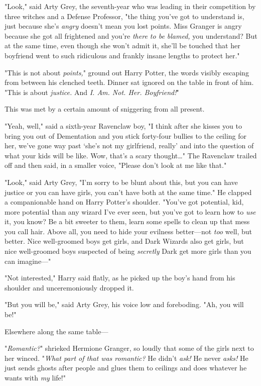 "Look," said Arty Grey, the seventh-year who was leading in their competition 
by three witches and a Defense Professor, "the thing you've got to understand 
is, just because she's \emph{angry} doesn't mean you lost points. Miss Granger 
is angry because she got all frightened and you're \emph{there to be blamed,} 
you understand? But at the same time, even though she won't admit it, she'll be 
touched that her boyfriend went to such ridiculous and frankly insane lengths 
to protect her."

"This is not about \emph{points,}" ground out Harry Potter, the words visibly 
escaping from between his clenched teeth. Dinner sat ignored on the table in 
front of him. "This is about \emph{justice.} And \emph{I. Am. Not. Her. 
Boyfriend!}"

This was met by a certain amount of sniggering from all present.

"Yeah, well," said a sixth-year Ravenclaw boy, "I think after she kisses you to 
bring you out of Dementation and you stick forty-four bullies to the ceiling 
for her, we've gone way past `she's not my girlfriend, really' and into the 
question of what your kids will be like. Wow, that's a scary thought{\ldots}" 
The Ravenclaw trailed off and then said, in a smaller voice, "Please don't look 
at me like that."

"Look," said Arty Grey, "I'm sorry to be blunt about this, but you can have 
justice or you can have girls, you can't have both at the same time." He 
clapped a companionable hand on Harry Potter's shoulder. "You've got potential, 
kid, more potential than any wizard I've ever seen, but you've got to learn how 
to \emph{use} it, you know? Be a bit sweeter to them, learn some spells to 
clean up that mess you call hair. Above all, you need to hide your evilness 
better---not \emph{too} well, but better. Nice well-groomed boys get girls, and 
Dark Wizards also get girls, but nice well-groomed boys suspected of being 
\emph{secretly} Dark get more girls than you can imagine---"

"Not interested," Harry said flatly, as he picked up the boy's hand from his 
shoulder and unceremoniously dropped it.

"But you will be," said Arty Grey, his voice low and foreboding. "Ah, you will 
be!"

Elsewhere along the same table---

"\emph{Romantic?}" shrieked Hermione Granger, so loudly that some of the girls 
next to her winced. "\emph{What part of that was romantic?} He didn't 
\emph{ask!} He never \emph{asks!} He just sends ghosts after people and glues 
them to ceilings and does whatever he wants with \emph{my} life!"


